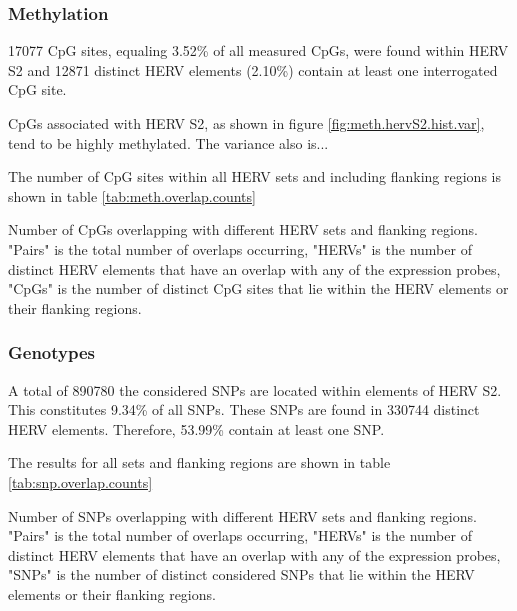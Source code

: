 \documentclass[a4paper,12pt]{article}
\begin{document}
\subsubsection{Methylation}
17077 CpG sites, equaling 3.52\% of all measured CpGs, were found within HERV S2 and 12871 distinct HERV elements (2.10\%) contain at least one interrogated CpG site.

CpGs associated with HERV S2, as shown in figure \ref{fig:meth.hervS2.hist.var}, tend to be highly methylated. The variance also is...

The number of CpG sites within all HERV sets and including flanking regions is shown in table \ref{tab:meth.overlap.counts}

\begin{table}[h!]
  \begin{center}
  \end{center}        
	\caption{Number of CpGs overlapping with different HERV sets and flanking regions. "Pairs" is the total number of overlaps occurring, "HERVs" is the number of distinct HERV elements that have an overlap with any of the expression probes, "CpGs" is the number of distinct CpG sites that lie within the HERV elements or their flanking regions.}
	\label{tab:meth.overlap.counts}
\end{table} 
\subsubsection{Genotypes}
A total of 890780 the considered SNPs are located within elements of HERV S2. This constitutes 9.34\% of all SNPs. These SNPs are found in 330744 distinct HERV elements. Therefore, 53.99\% contain at least one SNP.

The results for all sets and flanking regions are shown in table \ref{tab:snp.overlap.counts}

\begin{table}[h!]
  \begin{center}
  \end{center}        
	\caption{Number of SNPs overlapping with different HERV sets and flanking regions. "Pairs" is the total number of overlaps occurring, "HERVs" is the number of distinct HERV elements that have an overlap with any of the expression probes, "SNPs" is the number of distinct considered SNPs that lie within the HERV elements or their flanking regions.}
	\label{tab:snp.overlap.counts}
\end{table} 
\end{document}

